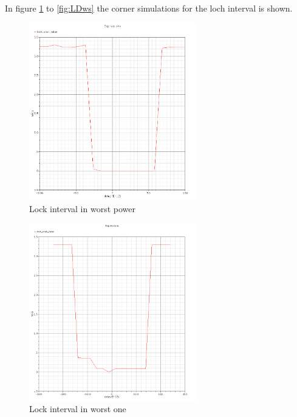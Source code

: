 \documentclass[a4paper,12pt]{article} \usepackage{graphicx}
\begin{document}
In figure \ref{fig:LDwp} to \ref{fig:LDws} the corner simulations for
the loch interval is shown.

\begin{figure}[h]
  \centering
  \includegraphics[width=0.65\textwidth]{../Bilder/LD_tran/LD_lsim_wp.png}
  \caption{Lock interval in worst power}
  \label{fig:LDwp}
\end{figure}

\begin{figure}[h]
  \centering
  \includegraphics[width=0.65\textwidth]{../Bilder/LD_tran/LD_lsim_wo.png}
  \caption{Lock interval in worst one}
  \label{fig:LDwo}
\end{figure}
\end{document}
